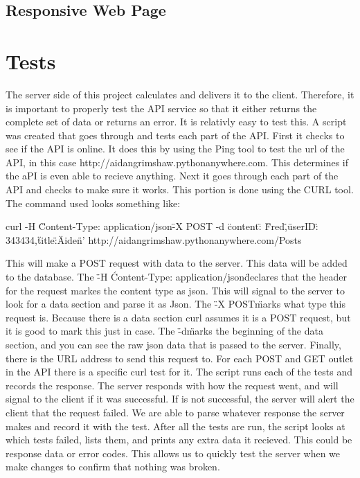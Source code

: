 \documentclass[12pt]{article}
\begin{document}
\subsection{Responsive Web Page}

\section{Tests}

The server side of this project calculates and delivers it to the client.  Therefore, it is important to properly test the API service so that it either returns the complete set of data or returns an error.  It is relativly easy to test this.  A script was created that goes through and tests each part of the API.  First it checks to see if the API is online.  It does this by using the Ping tool to test the url of the API, in this case http://aidangrimshaw.pythonanywhere.com.  This determines if the aPI is even able to recieve anything.  Next it goes through each part of the API and checks to make sure it works.  This portion is done using the CURL tool.  The command used looks something like: 

curl -H \"Content-Type: application/json\" -X POST -d \'{ \"content\": \"Fred\",\"userID\": 343434,\"title\":\"Aiden\"}' http://aidangrimshaw.pythonanywhere.com/Posts 

This will make a POST request with data to the server.  This data will be added to the database.  The \"-H \'Content-Type: application/json\" declares that the header for the request markes the content type as json.  This will signal to the server to look for a data section and parse it as Json.  The \"-X POST\" marks what type this request is.  Because there is a data section curl assumes it is a POST request, but it is good to mark this just in case.  The \"-d\" marks the beginning of the data section, and you can see the raw json data that is passed to the server.  Finally, there is the URL address to send this request to.  For each POST and GET outlet in the API there is a specific curl test for it.  The script runs each of the tests and records the response.  The server responds with how the request went, and will signal to the client if it was successful.  If is not successful, the server will alert the client that the request failed.  We are able to parse whatever response the server makes and record it with the test.  After all the tests are run, the script looks at which tests failed, lists them, and prints any extra data it recieved.  This could be response data or error codes.  This allows us to quickly test the server when we make changes to confirm that nothing was broken.
\end{document}
